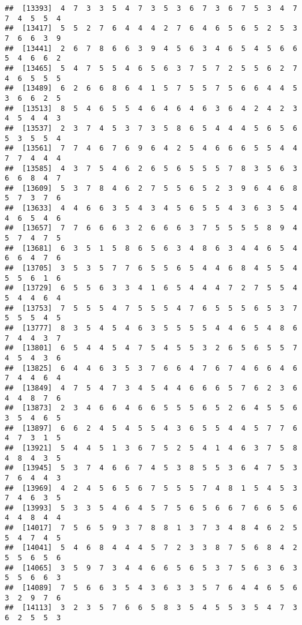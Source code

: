 \documentclass[
]{book}
\begin{document}
\begin{verbatim}
##  [13393]  4  7  3  3  5  4  7  3  5  3  6  7  3  6  7  5  3  4  7  7  4  5  5  4
##  [13417]  5  5  2  7  6  4  4  4  2  7  6  4  6  5  6  5  2  5  3  7  6  6  3  9
##  [13441]  2  6  7  8  6  6  3  9  4  5  6  3  4  6  5  4  5  6  6  5  4  6  6  2
##  [13465]  5  4  7  5  5  4  6  5  6  3  7  5  7  2  5  5  6  2  7  4  6  5  5  5
##  [13489]  6  2  6  6  8  6  4  1  5  7  5  5  7  5  6  6  4  4  5  3  6  6  2  5
##  [13513]  8  5  4  6  5  5  4  6  4  6  4  6  3  6  4  2  4  2  3  4  5  4  4  3
##  [13537]  2  3  7  4  5  3  7  3  5  8  6  5  4  4  4  5  6  5  6  5  3  5  5  4
##  [13561]  7  7  4  6  7  6  9  6  4  2  5  4  6  6  6  5  5  4  4  7  7  4  4  4
##  [13585]  4  3  7  5  4  6  2  6  5  6  5  5  5  7  8  3  5  6  3  6  6  8  4  7
##  [13609]  5  3  7  8  4  6  2  7  5  5  6  5  2  3  9  6  4  6  8  5  7  3  7  6
##  [13633]  4  4  6  6  3  5  4  3  4  5  6  5  5  4  3  6  3  5  4  4  6  5  4  6
##  [13657]  7  7  6  6  6  3  2  6  6  6  3  7  5  5  5  5  8  9  4  5  7  4  7  5
##  [13681]  6  3  5  1  5  8  6  5  6  3  4  8  6  3  4  4  6  5  4  6  6  4  7  6
##  [13705]  3  5  3  5  7  7  6  5  5  6  5  4  4  6  8  4  5  5  4  5  5  6  1  6
##  [13729]  6  5  5  6  3  3  4  1  6  5  4  4  4  7  2  7  5  5  4  5  4  4  6  4
##  [13753]  7  5  5  5  4  7  5  5  5  4  7  6  5  5  5  6  5  3  7  5  5  5  4  5
##  [13777]  8  3  5  4  5  4  6  3  5  5  5  5  4  4  6  5  4  8  6  7  4  4  3  7
##  [13801]  6  5  4  4  5  4  7  5  4  5  5  3  2  6  5  6  5  5  7  4  5  4  3  6
##  [13825]  6  4  4  6  3  5  3  7  6  6  4  7  6  7  4  6  6  4  6  7  4  4  6  4
##  [13849]  4  7  5  4  7  3  4  5  4  4  6  6  6  5  7  6  2  3  6  4  4  8  7  6
##  [13873]  2  3  4  6  6  4  6  6  5  5  5  6  5  2  6  4  5  5  6  3  5  4  6  5
##  [13897]  6  6  2  4  5  4  5  5  4  3  6  5  5  4  4  5  7  7  6  4  7  3  1  5
##  [13921]  5  4  4  5  1  3  6  7  5  2  5  4  1  4  6  3  7  5  8  4  8  4  3  5
##  [13945]  5  3  7  4  6  6  7  4  5  3  8  5  5  3  6  4  7  5  3  7  6  4  4  3
##  [13969]  4  2  4  5  6  5  6  7  5  5  5  7  4  8  1  5  4  5  3  7  4  6  3  5
##  [13993]  5  3  3  5  4  6  4  5  7  5  6  5  6  6  7  6  6  5  6  4  4  8  4  4
##  [14017]  7  5  6  5  9  3  7  8  8  1  3  7  3  4  8  4  6  2  5  5  4  7  4  5
##  [14041]  5  4  6  8  4  4  4  5  7  2  3  3  8  7  5  6  8  4  2  5  5  6  5  6
##  [14065]  3  5  9  7  3  4  4  6  6  5  6  5  3  7  5  6  3  6  3  5  5  6  6  3
##  [14089]  7  5  6  6  3  5  4  3  6  3  3  5  7  6  4  4  6  5  6  3  2  9  7  6
##  [14113]  3  2  3  5  7  6  6  5  8  3  5  4  5  5  3  5  4  7  3  6  2  5  5  3

\end{verbatim}
\end{document}
